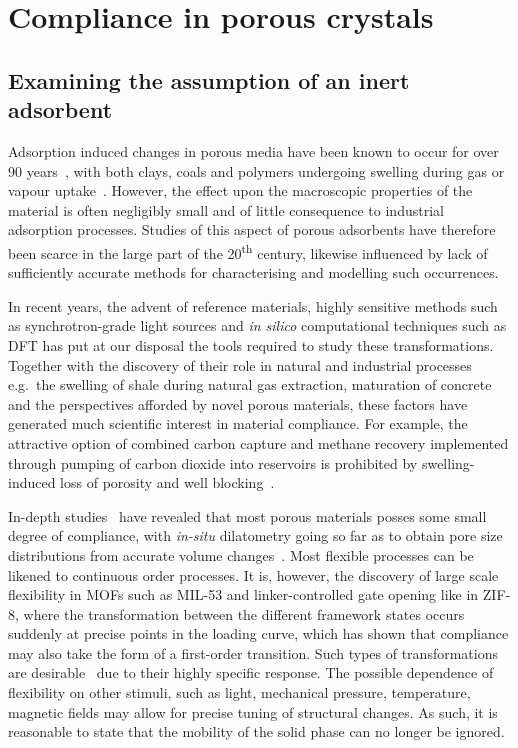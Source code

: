 
\section{Compliance in porous crystals}

\subsection{Examining the assumption of an inert adsorbent}

Adsorption induced changes in porous media have been known
to occur for over 90 years~\cite{mcbainNatureInfluenceHumidity1927},
with both clays, coals and polymers undergoing swelling during gas
or vapour uptake~\cite{gorAdsorptioninducedDeformationNanoporous2017}.
However, the effect upon the macroscopic properties of the material is 
often negligibly small and of little consequence to industrial adsorption
processes. Studies of this aspect of porous adsorbents have therefore
been scarce in the large part of the 20\textsuperscript{th} century,
likewise influenced by lack of sufficiently accurate methods for 
characterising and modelling such occurrences.

In recent years, the advent of reference materials, 
highly sensitive methods such as synchrotron-grade light sources and
\textit{in silico} computational techniques such as DFT has put at
our disposal the tools required to study these transformations. 
Together with the discovery of their role in natural and industrial 
processes e.g.\ the swelling of shale during natural gas extraction,
maturation of concrete and the perspectives afforded by novel porous
materials, these factors have generated much scientific interest
in material compliance. For example, the attractive option
of combined carbon capture and methane recovery implemented 
through pumping of carbon dioxide into reservoirs is prohibited
by swelling-induced loss of porosity and well 
blocking~\cite{gorAdsorptioninducedDeformationNanoporous2017}. 

In-depth studies~\cite{beringAlterationZeoliteGranule1977} 
have revealed that most porous materials posses some small
degree of compliance, with \textit{in-situ} dilatometry going so far as to 
obtain pore size distributions from accurate volume
changes~\cite{reichenauerExtractingPoreSize2001}. Most flexible 
processes can be likened to continuous order processes. It is, however,
the discovery of large scale flexibility in MOFs such as 
MIL-53 and linker-controlled gate opening like in ZIF-8, 
where the transformation between the different framework 
states occurs suddenly at precise points in the loading curve,
which has shown that compliance may also take the form of 
a first-order transition. Such types of transformations are
desirable~\cite{kitagawaFunctionalPorousCoordination2004} due to 
their highly specific response. The possible dependence 
of flexibility on other stimuli, such as light, mechanical pressure,
temperature, magnetic fields may allow for precise tuning of 
structural changes. As such, it is reasonable to state that
the mobility of the solid phase can no longer be ignored.

